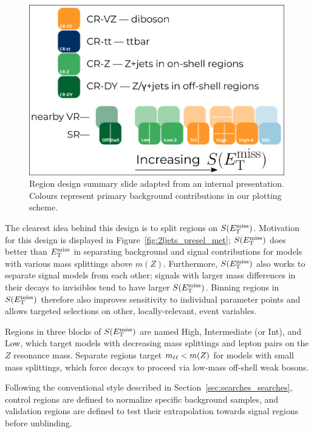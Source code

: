 \begin{figure}[tp]
\centering
\includegraphics[width=0.99\textwidth]{figures/2Ljets_pam_ewkslide.png}
\caption[
Region design summary slide
]{%
Region design summary slide adapted from an internal presentation.
Colours represent primary background contributions in our plotting scheme.
}
\label{fig:2ljets_region_summary}
\end{figure}

The clearest idea behind this design is to split regions on $S(E_\mathrm{T}^\mathrm{miss})$.
Motivation for this design is displayed in
Figure~\ref{fig:2ljets_presel_met};
$S(E_\mathrm{T}^\mathrm{miss})$ does better than $E_\mathrm{T}^\mathrm{miss}$ in separating background and signal
contributions for models with various mass splittings above $m(Z)$.
Furthermore, $S(E_\mathrm{T}^\mathrm{miss})$ also works to separate signal models from each other;
signals with larger mass differences in their decays to invisibles tend to have
larger $S(E_\mathrm{T}^\mathrm{miss})$.
Binning regions in $S(E_\mathrm{T}^\mathrm{miss})$ therefore also improves sensitivity to
individual parameter points and allows targeted selections on other,
locally-relevant, event variables.

Regions in three blocks of $S(E_\mathrm{T}^\mathrm{miss})$ are named High, Intermediate (or Int),
and Low,
which target models with decreasing mass splittings and lepton pairs on the
$Z$ resonance mass.
Separate regions target $m_{\ell\ell} < m(Z)$ for models with small mass splittings,
which force decays to proceed via low-mass off-shell weak bosons.

Following the conventional style described in
Section~\ref{sec:searches_searches},
control regions are defined to normalize specific background samples,
and validation regions are defined to test their extrapolation towards
signal regions before unblinding.


